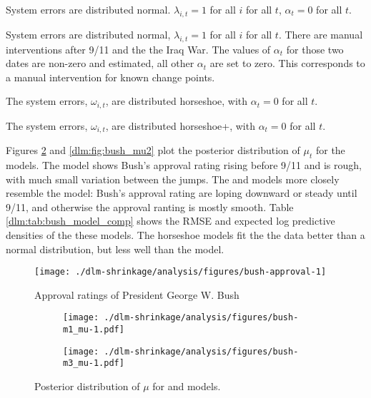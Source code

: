 \begin{description}[font = \normalfont\ModelII]
\item[Normal]
  System errors are distributed normal.
  $\lambda_{i, t} = 1$  for all $i$ for all $t$, $\alpha_{t} = 0$ for all $t$.
\item[Intervention]
  System errors are distributed normal, $\lambda_{i, t} = 1$  for all $i$ for all $t$.
  There are manual interventions after 9/11 and the the Iraq War. 
  The values of $\alpha_{t}$ for those two dates are non-zero and estimated, all other $\alpha_{t}$ are set to zero.
  This corresponds to a manual intervention for known change points.
\item[Horseshoe] The system errors, $\omega_{i,t}$, are distributed horseshoe, with $\alpha_{t} = 0$ for all $t$.
\item[Horseshoe+] The system errors, $\omega_{i,t}$, are distributed horseshoe+, with  $\alpha_{t}= 0$ for all $t$.
\end{description}


Figures \ref{dlm:fig:bush_mu1} and \ref{dlm:fig:bush_mu2} plot the posterior distribution of $\mu_{t}$ for the models.
The  model shows Bush's approval rating rising before 9/11 and is rough, with much small variation between the jumps.
The  and  models more closely resemble the  model:
Bush's approval rating are loping downward or steady until 9/11, and otherwise the approval ranting is mostly smooth.
Table \ref{dlm:tab:bush_model_comp} shows the RMSE and expected log predictive densities of the these models. 
The horseshoe models fit the the data better than a normal distribution, but less well than the  model.

\begin{figure}[thbp!]
  \centering
  \texttt{[image: ./dlm-shrinkage/analysis/figures/bush-approval-1]}
  \caption{Approval ratings of President George W. Bush}
  \label{dlm:fig:bush_approval}
\end{figure}

\begin{figure}[thbp!]
  \centering
  \begin{subfigure}[b]{\linewidth}
    \texttt{[image: ./dlm-shrinkage/analysis/figures/bush-m1\_mu-1.pdf]}
    \caption{}
  \end{subfigure}

  \begin{subfigure}[b]{\linewidth}
    \texttt{[image: ./dlm-shrinkage/analysis/figures/bush-m3\_mu-1.pdf]}
    \caption{}
  \end{subfigure}
  \caption{Posterior distribution of $\mu$ for  and  models.}
  \label{dlm:fig:bush_mu1}
\end{figure}

